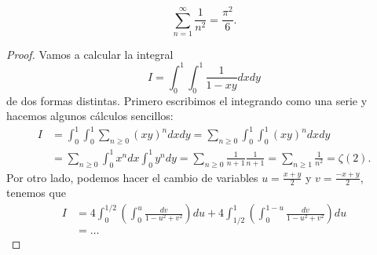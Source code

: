 \begin{theorem}
	\[
	\sum_{n=1}^{\infty}\frac{1}{n^2}=\frac{\pi^2}{6}.
	\]
\end{theorem}

\begin{proof}
	Vamos a calcular la integral 
	\[
		I=\int_0^1\int_0^1 \frac{1}{1-xy}dxdy
	\]
	de dos formas distintas. Primero escribimos el integrando como una serie y
	hacemos algunos cálculos sencillos:
	\begin{align*}
		I&=\int_0^1\int_0^1 \sum_{n\geq0}(xy)^ndxdy
		=\sum_{n\geq0}\int_0^1\int_0^1 (xy)^ndxdy\\
		&=\sum_{n\geq0}\int_0^1x^ndx\int_0^1y^ndy
		=\sum_{n\geq0}\frac{1}{n+1}\frac{1}{n+1}
		=\sum_{n\geq1}\frac{1}{n^2}=\zeta(2).
	\end{align*}
	Por otro lado, podemos hacer el cambio de variables $u=\frac{x+y}{2}$ y $v=\frac{-x+y}{2}$, tenemos que 
	\begin{align*}
		I&=4\int_0^{1/2}\left(\int_0^u\frac{dv}{1-u^2+v^2}\right)du+4\int_{1/2}^1\left(\int_0^{1-u}\frac{dv}{1-u^2+v^2}\right)du\\
		&=\dots
	\end{align*}
\end{proof}
